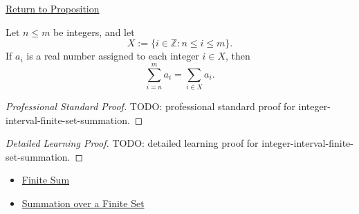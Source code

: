 \newpage
{}
\label{prf:integer-interval-finite-set-summation}

\begin{remark*}[Return]
\hyperref[prop:integer-interval-finite-set-summation]{Return to Proposition}
\end{remark*}

\begin{proposition*}
Let \(n \le m\) be integers, and let
\[
  X:=\{i\in\mathbb{Z}:n\le i\le m\}.
\]
If \(a_i\) is a real number assigned to each integer \(i\in X\), then
\[
  \sum_{i=n}^{m} a_i
  =
  \sum_{i\in X} a_i.
\]
\end{proposition*}

\begin{proof}[Professional Standard Proof]
\LRAProofBodyStart
TODO: professional standard proof for integer-interval-finite-set-summation.
\end{proof}

\begin{proof}[Detailed Learning Proof]
\LRAProofBodyStart
TODO: detailed learning proof for integer-interval-finite-set-summation.
\end{proof}

\begin{remark*}
\end{remark*}

\begin{dependencies}
\begin{itemize}
  \item \hyperref[def:finite-sum]{Finite Sum}
  \item \hyperref[def:summation-over-finite-set]{Summation over a Finite Set}
\end{itemize}
\end{dependencies}

\clearpage
